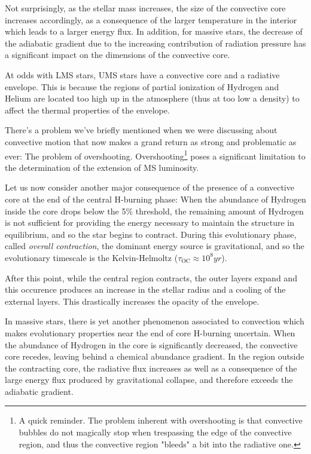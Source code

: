 \par Not surprisingly, as the stellar mass increases, the size of the convective core increases accordingly, as a consequence of the larger temperature in the interior which leads to a larger energy flux. In addition, for massive stars, the decrease of the adiabatic gradient due to the increasing contribution of radiation pressure has a significant impact on the dimensions of the convective core.
\par At odds with LMS stars, UMS stars have a convective core and a radiative envelope. This is because the regions of partial ionization of Hydrogen and Helium are located too high up in the atmosphere (thus at too low a density) to affect the thermal properties of the envelope.
\par There's a problem we've briefly mentioned when we were discussing about convective motion that now makes a grand return as strong and problematic as ever: The problem of overshooting. Overshooting\footnote{A quick reminder. The problem inherent with overshooting is that convective bubbles do not magically stop when trespassing the edge of the convective region, and thus the convective region "bleeds" a bit into the radiative one.} poses a significant limitation to the determination of the extension of MS luminosity.
\par Let us now consider another major consequence of the presence of a convective core at the end of the central H-burning phase: When the abundance of Hydrogen inside the core drops below the 5\% threshold, the remaining amount of Hydrogen is not sufficient for providing the energy necessary to maintain the structure in equilibrium, and so the star begins to contract. During this evolutionary phase, called \emph{overall contraction}, the dominant energy source is gravitational, and so the evolutionary timescale is the Kelvin-Helmoltz ($\tau_{\text{OC}}\approx 10^{8}\unit{yr}$).
\par After this point, while the central region contracts, the outer layers expand and this occurence produces an increase in the stellar radius and a cooling of the external layers. This drastically increases the opacity of the envelope.
\par In massive stars, there is yet another phenomenon associated to convection which makes evolutionary properties near the end of core H-burning uncertain. When the abundance of Hydrogen in the core is significantly decreased, the convective core recedes, leaving behind a chemical abundance gradient. In the region outside the contracting core, the radiative flux increases as well as a consequence of the large energy flux produced by gravitational collapse, and therefore exceeds the adiabatic gradient.
